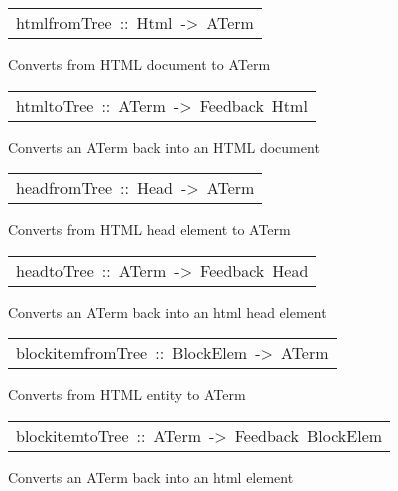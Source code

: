 \begin{haddockdesc}
\item[\begin{tabular}{@{}l}
htmlfromTree\ ::\ Html\ ->\ ATerm
\end{tabular}]\haddockbegindoc
Converts from HTML document to ATerm
\par

\end{haddockdesc}
\begin{haddockdesc}
\item[\begin{tabular}{@{}l}
htmltoTree\ ::\ ATerm\ ->\ Feedback\ Html
\end{tabular}]\haddockbegindoc
Converts an ATerm back into an HTML document
\par

\end{haddockdesc}
\begin{haddockdesc}
\item[\begin{tabular}{@{}l}
headfromTree\ ::\ Head\ ->\ ATerm
\end{tabular}]\haddockbegindoc
Converts from HTML head element to ATerm
\par

\end{haddockdesc}
\begin{haddockdesc}
\item[\begin{tabular}{@{}l}
headtoTree\ ::\ ATerm\ ->\ Feedback\ Head
\end{tabular}]\haddockbegindoc
Converts an ATerm back into an html head element
\par

\end{haddockdesc}
\begin{haddockdesc}
\item[\begin{tabular}{@{}l}
blockitemfromTree\ ::\ BlockElem\ ->\ ATerm
\end{tabular}]\haddockbegindoc
Converts from HTML entity to ATerm
\par

\end{haddockdesc}
\begin{haddockdesc}
\item[\begin{tabular}{@{}l}
blockitemtoTree\ ::\ ATerm\ ->\ Feedback\ BlockElem
\end{tabular}]\haddockbegindoc
Converts an ATerm back into an html element
\par

\end{haddockdesc}
